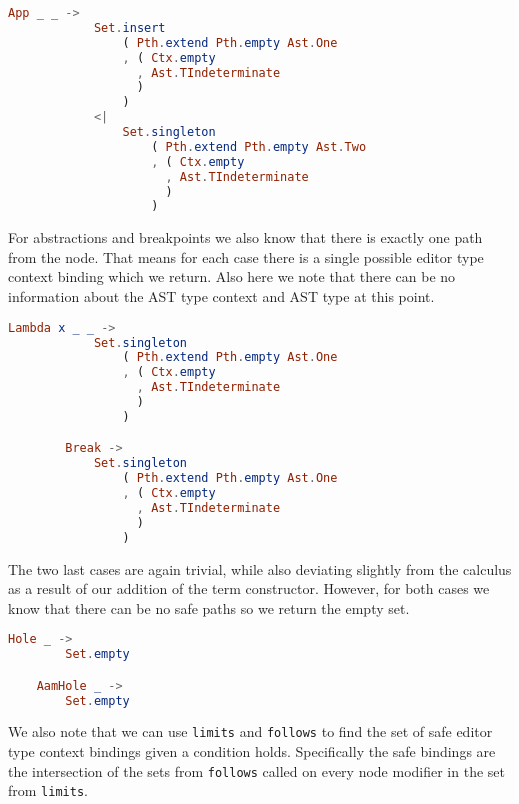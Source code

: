 \begin{lstlisting}[language=elm,%
    gobble=8,%
    ]
        App _ _ ->
            Set.insert
                ( Pth.extend Pth.empty Ast.One
                , ( Ctx.empty
                  , Ast.TIndeterminate
                  )
                )
            <|
                Set.singleton
                    ( Pth.extend Pth.empty Ast.Two
                    , ( Ctx.empty
                      , Ast.TIndeterminate
                      )
                    )
\end{lstlisting}
For abstractions and breakpoints we also know that there is exactly one path
from the node. That means for each case there is a single possible editor type
context binding which we return. Also here we note that there can be no
information about the AST type context and AST type at this point.
\begin{lstlisting}[language=elm,%
    gobble=8,%
    ]
        Lambda x _ _ ->
            Set.singleton
                ( Pth.extend Pth.empty Ast.One
                , ( Ctx.empty
                  , Ast.TIndeterminate
                  )
                )

        Break ->
            Set.singleton
                ( Pth.extend Pth.empty Ast.One
                , ( Ctx.empty
                  , Ast.TIndeterminate
                  )
                )
\end{lstlisting}
The two last cases are again trivial, while also deviating slightly from the
calculus as a result of our addition of the  term constructor.
However, for both cases we know that there can be no safe paths so we return
the empty set.
\begin{lstlisting}[language=elm,%
    gobble=4,%
    ]
    Hole _ ->
        Set.empty

    AamHole _ ->
        Set.empty
\end{lstlisting}

We also note that we can use \texttt{limits} and \texttt{follows} to find the
set of safe editor type context bindings given a condition holds. Specifically
the safe bindings are the intersection of the sets from \texttt{follows} called
on every node modifier in the set from \texttt{limits}.

